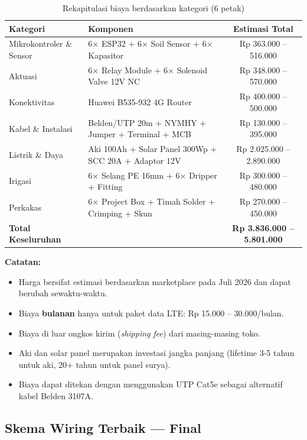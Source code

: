 \documentclass[12pt,a4paper,oneside]{report}
\begin{document}
\begin{table}[H]
\centering
\caption{Rekapitulasi biaya berdasarkan kategori (6 petak)}
\label{tab:cost-summary}
\begin{tabularx}{\textwidth}{l X c}
\toprule
\textbf{Kategori} & \textbf{Komponen} & \textbf{Estimasi Total} \\
\midrule
Mikrokontroler \& Sensor & 6× ESP32 + 6× Soil Sensor + 6× Kapasitor & Rp 363.000 -- 516.000 \\
Aktuasi & 6× Relay Module + 6× Solenoid Valve 12V NC & Rp 348.000 -- 570.000 \\
Konektivitas & Huawei B535-932 4G Router & Rp 400.000 -- 500.000 \\
Kabel \& Instalasi & Belden/UTP 20m + NYMHY + Jumper + Terminal + MCB & Rp 130.000 -- 395.000 \\
Listrik \& Daya & Aki 100Ah + Solar Panel 300Wp + SCC 20A + Adaptor 12V & Rp 2.025.000 -- 2.890.000 \\
Irigasi & 6× Selang PE 16mm + 6× Dripper + Fitting & Rp 300.000 -- 480.000 \\
Perkakas & 6× Project Box + Timah Solder + Crimping + Skun & Rp 270.000 -- 450.000 \\
\midrule
\textbf{Total Keseluruhan} & & \textbf{Rp 3.836.000 -- 5.801.000} \\
\bottomrule
\end{tabularx}
\end{table}

\textbf{Catatan:}
\begin{itemize}
    \item Harga bersifat estimasi berdasarkan marketplace pada Juli 2026 dan dapat berubah sewaktu-waktu.
    \item Biaya \textbf{bulanan} hanya untuk paket data LTE: Rp 15.000 -- 30.000/bulan.
    \item Biaya di luar ongkos kirim (\textit{shipping fee}) dari masing-masing toko.
    \item Aki dan solar panel merupakan investasi jangka panjang (lifetime 3-5 tahun untuk aki, 20+ tahun untuk panel surya).
    \item Biaya dapat ditekan dengan menggunakan UTP Cat5e sebagai alternatif kabel Belden 3107A.
\end{itemize}


\subsection{Skema Wiring Terbaik — Final}
\end{document}

